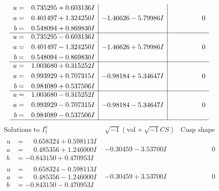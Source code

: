 \documentclass[1p]{elsarticle_modified}
\theoremstyle{definition}
\newcommand{\I}{\sqrt{-1}}
\begin{document}
$$\begin{array}{c|c|c}
\begin{aligned}
u &= \phantom{-}0.735295 + 0.603136 I \\
a &= \phantom{-}0.401497 + 1.324250 I \\
b &= \phantom{-}0.548094 + 0.869830 I\end{aligned}
 & -1.46626 - 5.79986 I & \phantom{-0.000000 } 0 \\ \hline\begin{aligned}
u &= \phantom{-}0.735295 - 0.603136 I \\
a &= \phantom{-}0.401497 - 1.324250 I \\
b &= \phantom{-}0.548094 - 0.869830 I\end{aligned}
 & -1.46626 + 5.79986 I & \phantom{-0.000000 } 0 \\ \hline\begin{aligned}
u &= \phantom{-}1.003680 + 0.315252 I \\
a &= \phantom{-}0.993929 + 0.707315 I \\
b &= \phantom{-}0.984089 + 0.537506 I\end{aligned}
 & -0.98184 + 5.34647 I & \phantom{-0.000000 } 0 \\ \hline\begin{aligned}
u &= \phantom{-}1.003680 - 0.315252 I \\
a &= \phantom{-}0.993929 - 0.707315 I \\
b &= \phantom{-}0.984089 - 0.537506 I\end{aligned}
 & -0.98184 - 5.34647 I & \phantom{-0.000000 } 0\\
 \hline 
 \end{array}$$\newpage$$\begin{array}{c|c|c}  
\text{Solutions to }I^u_{1}& \I (\text{vol} + \sqrt{-1}CS) & \text{Cusp shape}\\
 \hline 
\begin{aligned}
u &= \phantom{-}0.658324 + 0.598113 I \\
a &= \phantom{-}0.485356 + 1.246000 I \\
b &= -0.843150 + 0.470953 I\end{aligned}
 & -0.30459 - 3.53700 I & \phantom{-0.000000 } 0 \\ \hline\begin{aligned}
u &= \phantom{-}0.658324 - 0.598113 I \\
a &= \phantom{-}0.485356 - 1.246000 I \\
b &= -0.843150 - 0.470953 I\end{aligned}
 & -0.30459 + 3.53700 I & \phantom{-0.000000 } 0 \\ \hline\begin{aligned}

\end{aligned}
\end{array}$$
\end{document}
